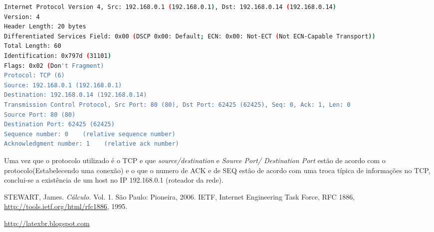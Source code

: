 \documentclass[a4paper]{report} %
\begin{document}
\begin{lstlisting}[language=bash]
Internet Protocol Version 4, Src: 192.168.0.1 (192.168.0.1), Dst: 192.168.0.14 (192.168.0.14)
Version: 4
Header Length: 20 bytes
Differentiated Services Field: 0x00 (DSCP 0x00: Default; ECN: 0x00: Not-ECT (Not ECN-Capable Transport))
Total Length: 60
Identification: 0x797d (31101)
Flags: 0x02 (Don't Fragment)
Protocol: TCP (6)
Source: 192.168.0.1 (192.168.0.1)
Destination: 192.168.0.14 (192.168.0.14)
Transmission Control Protocol, Src Port: 80 (80), Dst Port: 62425 (62425), Seq: 0, Ack: 1, Len: 0
Source Port: 80 (80)
Destination Port: 62425 (62425)
Sequence number: 0    (relative sequence number)
Acknowledgment number: 1    (relative ack number)
\end{lstlisting}

Uma vez que o protocolo utilizado é o TCP e que \textit{source/destination} e \textit{Source Port/ Destination Port} estão de acordo com o protocolo(Estabelecendo uma conexão) e o que o numero de ACK e de SEQ estão de acordo com uma troca típica de informações no TCP, conclui-se a existência de um host no IP 192.168.0.1 (roteador da rede).

\begin{thebibliography}{99}
 STEWART, James. {\sl C\'alculo.} Vol. 1. S\~ao Paulo: Pioneira, 2006.
 IETF, Internet Engineering Task Force, RFC 1886, \url{http://tools.ietf.org/html/rfc1886}, 1995.

\url{http://latexbr.blogspot.com}
\end{thebibliography}

\end{document}
